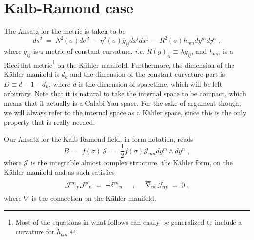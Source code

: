 \documentclass[a4paper,11pt]{article}
\begin{document}
\section{Kalb-Ramond case}
\label{sec:H}
\par
The Ansatz for the metric is taken to be
\begin{equation}
ds^{2}\;=\; N^{2}(\sigma )d\sigma^{2}
      \,-\,\eta^{2}(\sigma )\overline{g}_{ij}dx^{i}dx^{j}
      \,-\, R^{2}(\sigma )h_{mn}dy^{m}dy^{n} \; ,
\label{eq:AnsatzG}
\end{equation}
where $\overline{g}_{ij}$ is a metric of constant curvature, {\em i.e.}
$R(\overline{g})_{ij}\equiv \lambda \overline{g}_{ij}$, and $h_{mn}$ is
a Ricci flat metric\footnote{Most of the equations in what follows can
easily be generalized to include a curvature for $h_{mn}$.}
on the K\"ahler manifold.
Furthermore, the dimension
of the K\"ahler manifold is $d_{k}$ and the dimension of the constant 
curvature part is $D\equiv d-1-d_{k}$, where $d$ is the dimension 
of spacetime, which will be left arbitrary.
Note that it is natural to take the internal space to be compact,
which means that it actually is a Calabi-Yau space. 
For the sake of argument though, we will always refer to the internal
space as a K\"ahler space, since this is the only property that is 
really needed.
\par
%
Our Ansatz for the Kalb-Ramond field, in form notation, reads
\begin{equation}
  B \;=\; f(\sigma )\, \mathcal{J} 
    \;=\; \textstyle{\frac{1}{2}} f(\sigma )
               \mathcal{J}_{mn} dy^{m}\wedge dy^{n}
    \; ,
\end{equation}
where $\mathcal{J}$ is the integrable 
almost complex structure, the K\"ahler form, on the
K\"ahler manifold and as such satisfies \cite{art:kaehler}
\begin{equation}
{\mathcal{J}^{m}}_{p}{\mathcal{J}^{p}}_{n} \;=\; -{\delta^{m}}_{n} 
   \hspace{.5cm},\hspace{.5cm}
\overline{\nabla}_{m}\, \mathcal{J}_{np}\;=\; 0 \; ,
\label{eq:KDef}
\end{equation}
where $\overline{\nabla}$ is the connection on the K\"ahler manifold.
\end{document}
